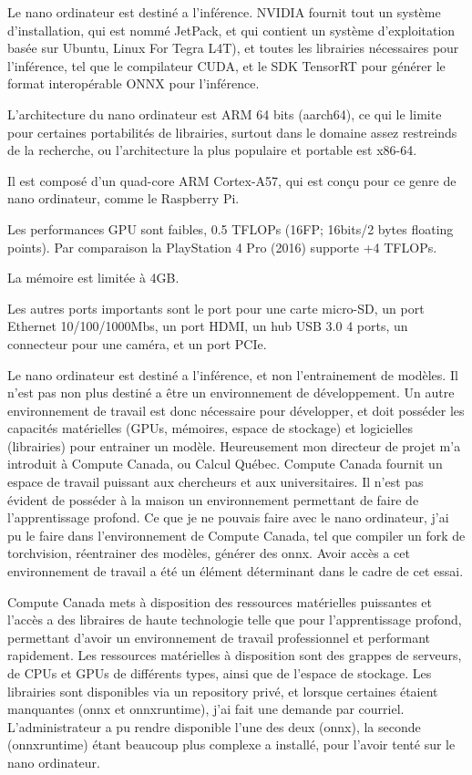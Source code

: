 ﻿
\par Le nano ordinateur est destiné a l'inférence. NVIDIA fournit tout un système d'installation, qui est nommé JetPack, et qui contient un système d'exploitation basée sur Ubuntu, Linux For Tegra L4T), et toutes les librairies nécessaires pour l'inférence, tel que le compilateur CUDA, et le SDK TensorRT pour générer le format interopérable ONNX pour l'inférence.
\par L'architecture du nano ordinateur est ARM 64 bits (aarch64), ce qui le limite pour certaines portabilités de librairies, surtout dans le domaine assez restreinds de la recherche, ou l'architecture la plus populaire et portable est x86-64. 
\par Il est composé d'un quad-core ARM Cortex-A57, qui est conçu pour ce genre de nano ordinateur, comme le Raspberry Pi.
\par Les performances GPU sont faibles, 0.5 TFLOPs (16FP; 16bits/2 bytes floating points). Par comparaison la PlayStation 4 Pro (2016) supporte +4 TFLOPs. 
\par La mémoire est limitée à 4GB. 
\par Les autres ports importants sont le port pour une carte micro-SD, un port Ethernet 10/100/1000Mbs, un port HDMI, un hub USB 3.0 4 ports, un connecteur pour une caméra, et un port PCIe.
\par Le nano ordinateur est destiné a l'inférence, et non l'entrainement de modèles. Il n'est pas non plus destiné a être un environnement de développement. Un autre environnement de travail est donc nécessaire pour développer, et doit posséder les capacités matérielles (GPUs, mémoires, espace de stockage) et logicielles (librairies) pour entrainer un modèle. Heureusement mon directeur de projet m'a introduit à Compute Canada, ou Calcul Québec. Compute Canada fournit un espace de travail puissant aux chercheurs et aux universitaires. Il n'est pas évident de posséder à la maison un environnement permettant de faire de l'apprentissage profond. Ce que je ne pouvais faire avec le nano ordinateur, j'ai pu le faire dans l'environnement de Compute Canada, tel que compiler un fork de torchvision, réentrainer des modèles, générer des onnx. Avoir accès a cet environnement de travail a été un élément déterminant dans le cadre de cet essai.
\par Compute Canada mets à disposition des ressources matérielles puissantes et l'accès a des libraires de haute technologie telle que pour l'apprentissage profond, permettant d'avoir un environnement de travail professionnel et performant rapidement. Les ressources matérielles à disposition sont des grappes de serveurs, de CPUs et GPUs de différents types, ainsi que de l'espace de stockage. Les librairies sont disponibles via un repository privé, et lorsque certaines étaient manquantes (onnx et onnxruntime), j'ai fait une demande par courriel. L'administrateur a pu rendre disponible l'une des deux (onnx), la seconde (onnxruntime) étant beaucoup plus complexe a installé, pour l'avoir tenté sur le nano ordinateur. 
